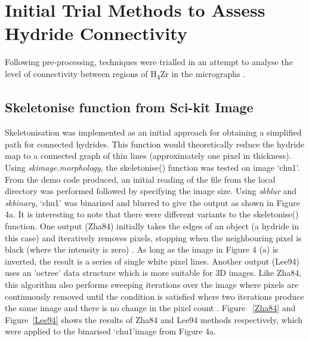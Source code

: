 \documentclass{article}
\begin{document}
	\section{Initial Trial Methods to Assess Hydride Connectivity}
	Following pre-processing, techniques were trialled in an attempt to analyse the level of connectivity between regions of H\textsubscript{4}Zr in the micrographs \cite{Simon2021}\cite{Sharma2018}\cite{Sunil2020}.

	\subsection{Skeletonise function from Sci-kit Image}
	Skeletonisation was implemented as an initial approach for obtaining a simplified path for connected hydrides. This function would theoretically reduce the hydride map to a connected graph of thin lines (approximately one pixel in thickness). Using \textit{skimage.morphology}, the skeletonise() function was tested on image ‘chu1’. From the demo code produced, an initial reading of the file from the local directory was performed followed by specifying the image size. Using \textit{skblur} and \textit {skbinary}, ‘chu1’ was binarized and blurred to give the output as shown in Figure 4a. It is interesting to note that there were different variants to the skeletonise() function. One output (Zha84) initially takes the edges of an object (a hydride in this case) and iteratively removes pixels, stopping when the neighbouring pixel is black (where the intensity is zero) \cite{ScikitimageA}. As long as the image in Figure 4 (a) is inverted, the result is a series of single white pixel lines. Another output (Lee94) uses an 'octree' data structure which is more suitable for 3D images. Like Zha84, this algorithm also performs sweeping iterations over the image where pixels are continuously removed until the condition is satisfied where two iterations produce the same image and there is no change in the pixel count \cite{ScikitimageA}. Figure ~\ref{Zha84}  and Figure~\ref{Lee94} shows the results of Zha84 and Lee94 methods respectively, which were applied to the binarised ‘chu1’image from Figure 4a.
\end{document}
